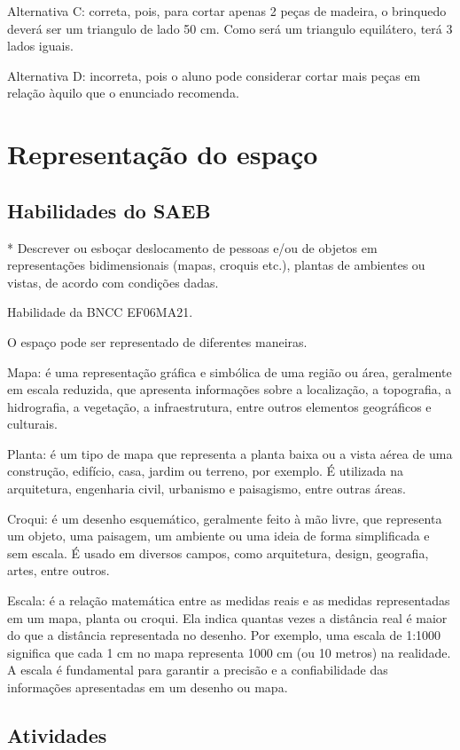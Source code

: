 Alternativa C: correta, pois, para cortar apenas 2 peças de madeira, o
brinquedo deverá ser um triangulo de lado 50 cm. Como será um triangulo
equilátero, terá 3 lados iguais.

Alternativa D: incorreta, pois o aluno pode considerar cortar mais peças
em relação àquilo que o enunciado recomenda.

\chapter{Representação do espaço}

\section{Habilidades do SAEB} * Descrever ou esboçar deslocamento de pessoas e/ou
de objetos em representações bidimensionais (mapas, croquis etc.),
plantas de ambientes ou vistas, de acordo com condições dadas.

Habilidade da BNCC EF06MA21.

O espaço pode ser representado de diferentes maneiras.

Mapa: é uma representação gráfica e simbólica de uma região ou área,
geralmente em escala reduzida, que apresenta informações sobre a
localização, a topografia, a hidrografia, a vegetação, a infraestrutura,
entre outros elementos geográficos e culturais.

Planta: é um tipo de mapa que representa a planta baixa ou a vista aérea
de uma construção, edifício, casa, jardim ou terreno, por exemplo. É
utilizada na arquitetura, engenharia civil, urbanismo e paisagismo,
entre outras áreas.

Croqui: é um desenho esquemático, geralmente feito à mão livre, que
representa um objeto, uma paisagem, um ambiente ou uma ideia de forma
simplificada e sem escala. É usado em diversos campos, como arquitetura,
design, geografia, artes, entre outros.

Escala: é a relação matemática entre as medidas reais e as medidas
representadas em um mapa, planta ou croqui. Ela indica quantas vezes a
distância real é maior do que a distância representada no desenho. Por
exemplo, uma escala de 1:1000 significa que cada 1 cm no mapa representa
1000 cm (ou 10 metros) na realidade. A escala é fundamental para
garantir a precisão e a confiabilidade das informações apresentadas em
um desenho ou mapa.

\section{Atividades}


